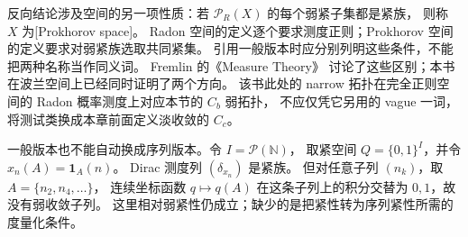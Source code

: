 反向结论涉及空间的另一项性质：若 \(\mathcal P_R(X)\) 的每个弱紧子集都是紧族，
则称 \(X\) 为[Prokhorov space]。
Radon 空间的定义逐个要求测度正则；Prokhorov 空间的定义要求对弱紧族选取共同紧集。
引用一般版本时应分别列明这些条件，不能把两种名称当作同义词。
Fremlin 的《Measure Theory》\cite[434C, 437P, and 437U--V]{Fremlin2016Measure}
讨论了这些区别；本书在波兰空间上已经同时证明了两个方向。
该书此处的 narrow 拓扑在完全正则空间的 Radon 概率测度上对应本节的 \(C_b\) 弱拓扑，
不应仅凭它另用的 vague 一词，将测试类换成本章前面定义淡收敛的 \(C_c\)。

\ProseParagraphBreak

一般版本也不能自动换成序列版本。令 \(I=\mathcal P(\mathbb N)\)，
取紧空间 \(Q=\{0,1\}^I\)，并令 \(x_n(A)=\mathbf1_A(n)\)。
Dirac 测度列 \((\delta_{x_n})\) 是紧族。
但对任意子列 \((n_k)\)，取 \(A=\{n_2,n_4,\ldots\}\)，
连续坐标函数 \(q\mapsto q(A)\) 在这条子列上的积分交替为 \(0,1\)，故没有弱收敛子列。
这里相对弱紧性仍成立；缺少的是把紧性转为序列紧性所需的度量化条件。
